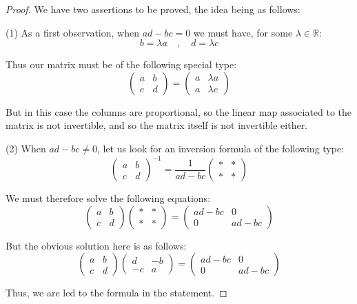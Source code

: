 \documentclass[12pt]{amsbook}
\begin{document}
\begin{proof}
We have two assertions to be proved, the idea being as follows:

\medskip

(1) As a first observation, when $ad-bc=0$ we must have, for some $\lambda\in\mathbb R$:
$$b=\lambda a\quad,\quad 
d=\lambda c$$

Thus our matrix must be of the following special type:
$$\begin{pmatrix}a&b\\ c&d\end{pmatrix}=\begin{pmatrix}a&\lambda a\\ a&\lambda c\end{pmatrix}$$

But in this case the columns are proportional, so the linear map associated to the matrix is not invertible, and so the matrix itself is not invertible either.

\medskip

(2) When $ad-bc\neq 0$, let us look for an inversion formula of the following type:
$$\begin{pmatrix}a&b\\ c&d\end{pmatrix}^{-1}
=\frac{1}{ad-bc}\begin{pmatrix}*&*\\ *&*\end{pmatrix}$$

We must therefore solve the following equations:
$$\begin{pmatrix}a&b\\ c&d\end{pmatrix}
\begin{pmatrix}*&*\\ *&*\end{pmatrix}=
\begin{pmatrix}ad-bc&0\\ 0&ad-bc\end{pmatrix}$$

But the obvious solution here is as follows:
$$\begin{pmatrix}a&b\\ c&d\end{pmatrix}
\begin{pmatrix}d&-b\\ -c&a\end{pmatrix}=
\begin{pmatrix}ad-bc&0\\ 0&ad-bc\end{pmatrix}$$

Thus, we are led to the formula in the statement.
\end{proof}
\end{document}
